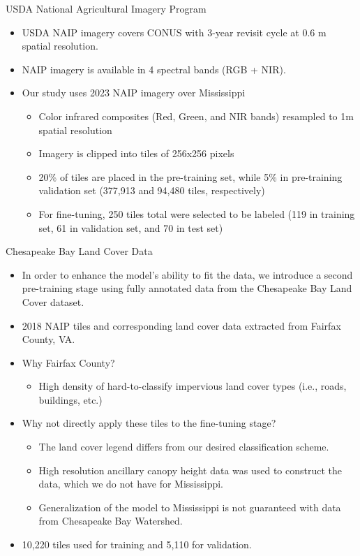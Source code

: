 \documentclass[aspectratio=169, hideallsubsectionså]{beamer}
\begin{document}
\begin{frame}{USDA National Agricultural Imagery Program}
    \begin{itemize}
        \item<1-> USDA NAIP imagery covers CONUS with 3-year revisit cycle at 0.6 m spatial resolution.
        \item<2-> NAIP imagery is available in 4 spectral bands (RGB + NIR).
        \item<3-> Our study uses 2023 NAIP imagery over Mississippi
        \begin{itemize}
            \item<4-> Color infrared composites (Red, Green, and NIR bands) resampled to 1m spatial resolution
            \item<5-> Imagery is clipped into tiles of 256x256 pixels
            \item<6-> 20\% of tiles are placed in the pre-training set, while 5\% in pre-training validation set (377,913 and 94,480 tiles, respectively)
            \item<7-> For fine-tuning, 250 tiles total were selected to be labeled (119 in training set, 61 in validation set, and 70 in test set)
        \end{itemize}
    \end{itemize}
\end{frame}

\begin{frame}{Chesapeake Bay Land Cover Data}
    \begin{itemize}
        \item<1-> In order to enhance the model's ability to fit the data, we introduce a second pre-training stage using fully annotated data from the Chesapeake Bay Land Cover dataset.
        \item<2-> 2018 NAIP tiles and corresponding land cover data extracted from Fairfax County, VA.
        \item<3-> Why Fairfax County? 
        \begin{itemize}
            \item<4-> High density of hard-to-classify impervious land cover types (i.e., roads, buildings, etc.) 
        \end{itemize}
        \item<5-> Why not directly apply these tiles to the fine-tuning stage?
        \begin{itemize}
            \item<6-> The land cover legend differs from our desired classification scheme.
            \item<7-> High resolution ancillary canopy height data was used to construct the data, which we do not have for Mississippi.
            \item<8-> Generalization of the model to Mississippi is not guaranteed with data from Chesapeake Bay Watershed. 
        \end{itemize}
        \item<9-> 10,220 tiles used for training and 5,110 for validation.
    \end{itemize}
\end{frame}
\end{document}
